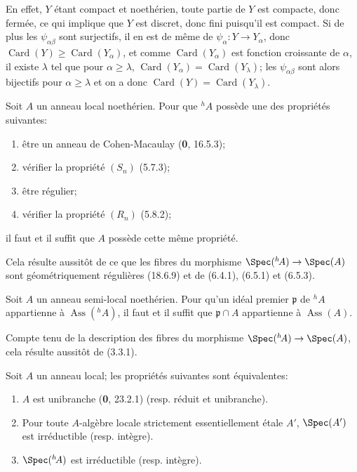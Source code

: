 En effet, $Y$ étant compact et noethérien, toute partie de $Y$ est compacte, donc fermée, ce qui implique que $Y$ est discret, donc fini puisqu'il est compact. Si de plus les $\psi_{\alpha\beta}$ sont surjectifs, il en est de même de $\psi_\alpha:Y\to Y_\alpha$, donc $\operatorname{Card}(Y)\geq\operatorname{Card}(Y_\alpha)$, et comme $\operatorname{Card}(Y_\alpha)$ est fonction croissante de $\alpha$, il existe $\lambda$ tel que pour $\alpha\geq\lambda$, $\operatorname{Card}(Y_\alpha)=\operatorname{Card}(Y_\lambda)$; les $\psi_{\alpha\beta}$ sont alors bijectifs pour $\alpha\geq\lambda$ et on a donc $\operatorname{Card}(Y)=\operatorname{Card}(Y_\lambda)$.

\begin{corollary}[18.6.10]
\label{IV.18.6.10}
Soit $A$ un anneau local noethérien. Pour que ${}^h\!A$ possède une des propriétés suivantes:
\begin{enumerate}
  \item[\textup{a)}] être un anneau de Cohen-Macaulay \textup{(\textbf{0}, 16.5.3)};
  \item[\textup{b)}] vérifier la propriété $(S_n)$ \textup{(5.7.3)};
  \item[\textup{c)}] être régulier;
  \item[\textup{d)}] vérifier la propriété $(R_n)$ \textup{(5.8.2)};
\end{enumerate}
il faut et il suffit que $A$ possède cette même propriété.
\end{corollary}


Cela résulte aussitôt de ce que les fibres du morphisme $\Spec({}^h\!A)\to\Spec(A)$ sont géométriquement régulières (18.6.9) et de (6.4.1), (6.5.1) et (6.5.3).

\begin{corollary}[18.6.11]
\label{IV.18.6.11}
Soit $A$ un anneau semi-local noethérien. Pour qu'un idéal premier $\mathfrak p$ de ${}^h\!A$ appartienne à $\operatorname{Ass}({}^h\!A)$, il faut et il suffit que $\mathfrak p\cap A$ appartienne à $\operatorname{Ass}(A)$.
\end{corollary}

Compte tenu de la description des fibres du morphisme $\Spec({}^h\!A)\to\Spec(A)$, cela résulte aussitôt de (3.3.1).

\begin{proposition}[18.6.12]
\label{IV.18.6.12}
Soit $A$ un anneau local; les propriétés suivantes sont équivalentes:
\begin{enumerate}
  \item[\textup{a)}] $A$ est unibranche \textup{(\textbf{0}, 23.2.1) (resp.} réduit et unibranche\textup{)}.
  \item[\textup{b)}] Pour toute $A$-algèbre locale strictement essentiellement étale $A'$, $\Spec(A')$ est irréductible \textup{(resp.} intègre\textup{)}.
  \item[\textup{c)}] $\Spec({}^h\!A)$ est irréductible \textup{(resp.} intègre\textup{)}.
\end{enumerate}
\end{proposition}

